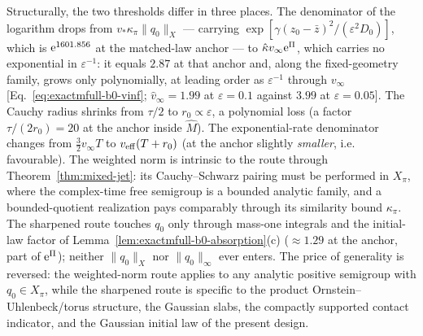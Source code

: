 \begin{remark}
Structurally, the two thresholds differ in three places.  The denominator
of the logarithm drops from \(v_*\kappa_\pi\|q_0\|_X\) --- carrying
\(\exp[\gamma(z_0-\bar z)^2/(\varepsilon^2D_0)]\), which is
\(\mathrm e^{1601.856}\) at the matched-law anchor --- to
\(\hat\kappa v_\infty\mathrm e^{\Pi}\), which carries no exponential in
\(\varepsilon^{-1}\): it equals \(2.87\) at that anchor and, along the
fixed-geometry family, grows only polynomially, at leading order as
\(\varepsilon^{-1}\) through \(v_\infty\)
[Eq.~\eqref{eq:exactmfull-b0-vinf}; \(\widehat v_\infty=1.99\) at
\(\varepsilon=0.1\) against \(3.99\) at \(\varepsilon=0.05\)].
The Cauchy radius shrinks from
\(\tau/2\) to \(r_0\propto\varepsilon\), a polynomial loss (a factor
\(\tau/(2r_0)=20\) at the anchor inside \(\hat M\)).  The exponential-rate
denominator changes from \(\tfrac32v_\infty T\) to
\(v_{\rm eff}(T+r_0)\) (at the anchor slightly \emph{smaller}, i.e.
favourable).  The weighted norm is intrinsic to the route through
Theorem~\ref{thm:mixed-jet}: its Cauchy--Schwarz pairing must be performed
in \(X_\pi\), where the complex-time free semigroup is a bounded analytic
family, and a bounded-quotient realization pays comparably through its
similarity bound \(\kappa_\pi\).  The sharpened route touches \(q_0\) only
through mass-one integrals and the initial-law factor of
Lemma~\ref{lem:exactmfull-b0-absorption}(c) (\(\approx1.29\) at the
anchor, part of \(\mathrm e^{\Pi}\)); neither \(\|q_0\|_X\) nor
\(\|q_0\|_\infty\) ever enters.  The price of generality is reversed: the
weighted-norm route applies to any analytic positive semigroup with
\(q_0\in X_\pi\), while the sharpened route is specific to the product
Ornstein--Uhlenbeck/torus structure, the Gaussian slabs, the compactly
supported contact indicator, and the Gaussian initial law of the present
design.
\end{remark}

